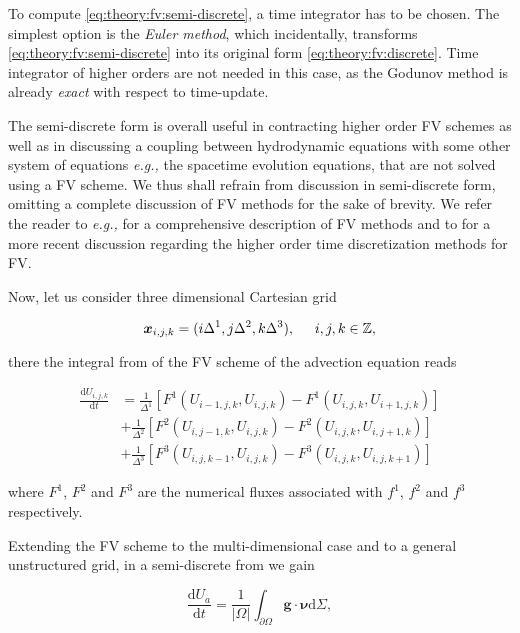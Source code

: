 To compute \ref{eq:theory:fv:semi-discrete}, a time integrator has to be chosen. 
The simplest option is the \textit{Euler method}, which incidentally, transforms \ref{eq:theory:fv:semi-discrete} into its original form \ref{eq:theory:fv:discrete}. 
Time integrator of higher orders are not needed in this case, as the Godunov method is already \textit{exact} with respect to time-update. 

The semi-discrete form is overall useful in contracting higher order FV schemes as well as in discussing a coupling between hydrodynamic equations with some other system of equations \textit{e.g.,} the spacetime evolution equations, that are not solved using a FV scheme. 
We thus shall refrain from discussion in semi-discrete form, omitting a complete discussion of FV methods for the sake of brevity. 
We refer the reader to \textit{e.g.,} \cite{Toro:1999} for a comprehensive description of FV methods and to \cite{Gassner:2011} for a more recent discussion regarding the higher order time discretization methods for FV.  

Now, let us consider three dimensional Cartesian grid 

\begin{equation}
\boldsymbol{x}_{i,j,k} = (i\Delta^1,j\Delta^2,k\Delta^3), \hspace{5mm} i, j, k \in \mathbb{Z},
\end{equation}

there the integral from of the FV scheme of the advection equation reads

\begin{align}
\frac{\text{d}U_{i,j,k}}{\text{d}t} &= \frac{1}{\Delta^1}[F^1(U_{i-1,j,k}, U_{i,j,k}) - F^1(U_{i,j,k}, U_{i+1,j,k})] \\
&+ \frac{1}{\Delta^2}[F^2(U_{i,j-1,k}, U_{i,j,k}) - F^2(U_{i,j,k}, U_{i,j+1,k})] \\
&+ \frac{1}{\Delta^3}[F^3(U_{i,j,k-1}, U_{i,j,k}) - F^3(U_{i,j,k}, U_{i,j,k+1})]
\label{eq:theory:fv:1storder3dscheme}
\end{align}

where $F^1$, $F^2$ and $F^3$ are the numerical fluxes associated with $f^1$, $f^2$ and $f^3$ respectively. 


Extending the FV scheme to the multi-dimensional case and to a general unstructured grid, in a semi-discrete from we gain

\begin{equation}
\frac{\text{d}U_a}{\text{d}t} = \frac{1}{|\Omega|}\int_{\partial\Omega}\boldsymbol{g}\cdot\boldsymbol{\nu}\text{d}\Sigma,
\end{equation}

